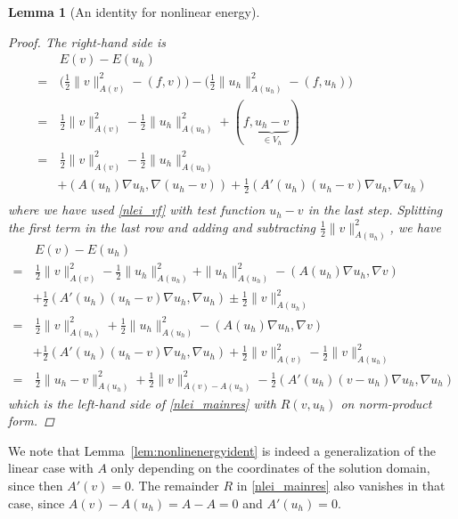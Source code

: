 \documentclass[10pt,a4paper]{amsart}
\theoremstyle{plain}
\newtheorem{lem}{Lemma}
\theoremstyle{definition}
\theoremstyle{remark}
\begin{document}
\begin{lem}[An identity for nonlinear energy]
	\begin{proof}
		The right-hand side is
		\begin{equation}
		\begin{aligned}
			& \, E(v) - E(u_{h}) \\
			= & \, \bigg( \frac{1}{2}\| v \|_{A(v)}^2 - (f,v) \bigg) - \bigg( \frac{1}{2}\| u_h \|_{A(u_h)}^2 - (f,u_h) \bigg) \\
			= & \, \frac{1}{2}\| v \|_{A(v)}^2 - \frac{1}{2}\| u_h \|_{A(u_h)}^2 + (f,\underbrace{u_h - v}_{\in V_h}) \\
			= & \, \frac{1}{2}\| v \|_{A(v)}^2 - \frac{1}{2}\| u_h \|_{A(u_h)}^2 \\
			& + (A(u_h) \nabla u_h, \nabla (u_h - v)) + \frac{1}{2}(A'(u_h) (u_h - v) \nabla u_h, \nabla u_h) \\
		\end{aligned}
		\end{equation}
		where we have used \eqref{nlei_vf} with test function $u_h - v$ in the last step. Splitting the first term in the last row and adding and subtracting $\frac{1}{2}\| v \|_{A(u_h)}^2$, we have
		\begin{equation}
		\begin{aligned}
			& \, E(v) - E(u_{h}) \\
			= & \, \frac{1}{2}\| v \|_{A(v)}^2 - \frac{1}{2}\| u_h \|_{A(u_h)}^2 + \| u_h \|_{A(u_h)}^2 - (A(u_h) \nabla u_h, \nabla v) \\
			& + \frac{1}{2}(A'(u_h) (u_h - v) \nabla u_h, \nabla u_h) \pm \frac{1}{2}\| v \|_{A(u_h)}^2 \\
			= & \, \frac{1}{2}\| v \|_{A(u_h)}^2 + \frac{1}{2}\| u_h \|_{A(u_h)}^2 - (A(u_h) \nabla u_h, \nabla v) \\
			& + \frac{1}{2}(A'(u_h) (u_h - v) \nabla u_h, \nabla u_h) + \frac{1}{2}\| v \|_{A(v)}^2 - \frac{1}{2}\| v \|_{A(u_h)}^2 \\
			= & \, \frac{1}{2}\| u_h - v \|_{A(u_h)}^2 + \frac{1}{2}\| v \|_{A(v) - A(u_h)}^2 - \frac{1}{2}(A'(u_h) (v - u_h) \nabla u_h, \nabla u_h)
		\end{aligned}
		\end{equation}
		which is the left-hand side of \eqref{nlei_mainres} with $R(v, u_h)$ on norm-product form.
	\end{proof}

\end{lem}

We note that Lemma~\ref{lem:nonlinenergyident} is indeed a generalization of the linear case with $A$ only depending on the coordinates of the solution domain, since then $A'(v) = 0$. The remainder $R$ in \eqref{nlei_mainres} also vanishes in that case, since $A(v) - A(u_h) = A - A = 0$ and $A'(u_h) = 0$.
\end{document}
